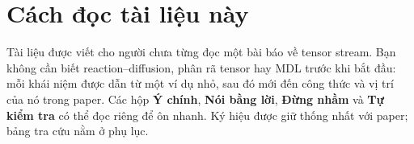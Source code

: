\documentclass[11pt,a4paper]{article}
\begin{document}
\hypersetup{pageanchor=false}
\DTTitlePage
\hypersetup{pageanchor=true}

\section*{Cách đọc tài liệu này}
Tài liệu được viết cho người chưa từng đọc một bài báo về tensor stream. Bạn không cần biết
reaction--diffusion, phân rã tensor hay MDL trước khi bắt đầu: mỗi khái niệm được dẫn từ
một ví dụ nhỏ, sau đó mới đến công thức và vị trí của nó trong paper. Các hộp
\textbf{Ý chính}, \textbf{Nói bằng lời}, \textbf{Đừng nhầm} và \textbf{Tự kiểm tra} có thể
đọc riêng để ôn nhanh. Ký hiệu được giữ thống nhất với paper; bảng tra cứu nằm ở phụ lục.

\tableofcontents
\clearpage











\appendix


\end{document}
